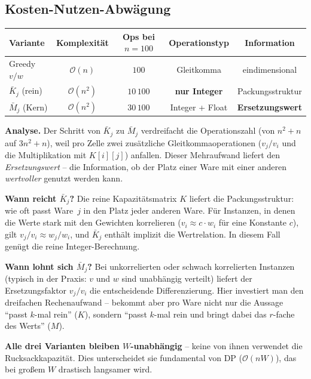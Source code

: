 \documentclass[a4paper,11pt]{article}
\begin{document}
\subsection{Kosten-Nutzen-Abwägung}

\begin{center}
\renewcommand{\arraystretch}{1.3}
\begin{tabular}{lcccc}
\toprule
Variante & Komplexität & Ops bei $n{=}100$
  & Operationstyp & Information \\
\midrule
Greedy $v/w$
  & $\mathcal{O}(n)$
  & $100$
  & Gleitkomma
  & eindimensional \\
$\bar{K}_j$ (rein)
  & $\mathcal{O}(n^2)$
  & $10\,100$
  & \textbf{nur Integer}
  & Packungsstruktur \\
$\bar{M}_j$ (Kern)
  & $\mathcal{O}(n^2)$
  & $30\,100$
  & Integer + Float
  & \textbf{Ersetzungswert} \\
\bottomrule
\end{tabular}
\end{center}

\noindent
\textbf{Analyse.}
Der Schritt von $\bar{K}_j$ zu $\bar{M}_j$ verdreifacht die
Operationszahl (von $n^2+n$ auf $3n^2+n$), weil pro Zelle zwei
zusätzliche Gleitkommaoperationen ($v_j/v_i$ und die Multiplikation
mit $K[i][j]$) anfallen. Dieser Mehraufwand liefert den
\emph{Ersetzungswert} -- die Information, ob der Platz einer
Ware mit einer anderen \emph{wertvoller} genutzt werden kann.

\medskip
\noindent
\textbf{Wann reicht $\bar{K}_j$?}
Die reine Kapazitätsmatrix $K$ liefert die Packungsstruktur:
wie oft passt Ware~$j$ in den Platz jeder anderen Ware.
Für Instanzen, in denen die Werte stark mit den Gewichten
korrelieren ($v_i \approx c \cdot w_i$ für eine Konstante $c$),
gilt $v_j/v_i \approx w_j/w_i$, und $\bar{K}_j$ enthält
implizit die Wertrelation. In diesem Fall genügt die reine
Integer-Berechnung.

\medskip
\noindent
\textbf{Wann lohnt sich $\bar{M}_j$?}
Bei unkorrelierten oder schwach korrelierten Instanzen
(typisch in der Praxis: $v$ und $w$ sind unabhängig verteilt)
liefert der Ersetzungsfaktor $v_j/v_i$ die entscheidende
Differenzierung. Hier investiert man den dreifachen
Rechenaufwand -- bekommt aber pro Ware nicht nur die
Aussage ``passt $k$-mal rein'' ($K$), sondern
``passt $k$-mal rein und bringt dabei das $r$-fache
des Werts'' ($M$).

\medskip
\noindent
\textbf{Alle drei Varianten bleiben $W$-unabhängig} --
keine von ihnen verwendet die Rucksackkapazität.
Dies unterscheidet sie fundamental von DP
($\mathcal{O}(nW)$), das bei großem $W$ drastisch
langsamer wird.
\end{document}
